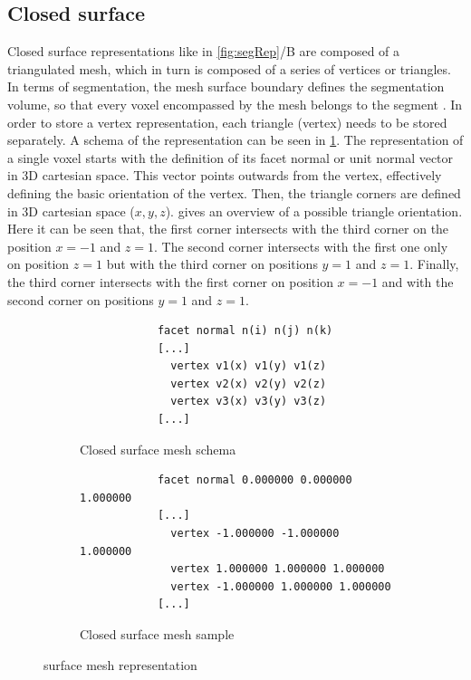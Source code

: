 \subsection{Closed surface}\label{s:b-closed-surface}
Closed surface representations like in \cref{fig:segRep}/B are composed of a triangulated mesh,
which in turn is composed of a series of vertices or triangles.
In terms of segmentation, the mesh surface boundary defines the segmentation volume,
so that every voxel encompassed by the mesh belongs to the segment \cite{delameMedialSurfaceMesh2012,weber3DSlicerPlatform2022,pinterPolymorphSegmentationRepresentation2019}.
In order to store a vertex representation, each triangle (vertex) needs to be stored separately.
A schema of the representation can be seen in \cref{fig:surfacemesh-schema}.
The representation of a single voxel starts with the definition of its facet normal or unit normal vector in 3D cartesian space.
This vector points outwards from the vertex, effectively defining the basic orientation of the vertex.
Then, the triangle corners are defined in 3D cartesian space ($x,y,z$).
 gives an overview of a possible triangle orientation.
Here it can be seen that, the first corner intersects with the third corner on the position
$x=-1$ and $z=1$.
The second corner intersects with the first one only on position $z=1$ but with the third corner on positions
$y=1$ and $z=1$.
Finally, the third corner intersects with the first corner on position $x=-1$ and
with the second corner on positions $y=1$ and $z=1$.

\begin{figure}[h] %
	\begin{subfigure}{0.49\textwidth}
		\begin{verbatim}
			facet normal n(i) n(j) n(k)
			[...]
			  vertex v1(x) v1(y) v1(z)
			  vertex v2(x) v2(y) v2(z)
			  vertex v3(x) v3(y) v3(z)
			[...]
		\end{verbatim}
		\caption{Closed surface mesh schema}\label{fig:surfacemesh-schema}
	\end{subfigure}
	\begin{subfigure}{0.49\textwidth}
		\begin{verbatim}
			facet normal 0.000000 0.000000 1.000000
			[...]
			  vertex -1.000000 -1.000000 1.000000
			  vertex 1.000000 1.000000 1.000000
			  vertex -1.000000 1.000000 1.000000
			[...]
		\end{verbatim}
		\caption{Closed surface mesh sample}\label{fig:surfacemesh}
	\end{subfigure}
	\caption{surface mesh representation}\label{fig:mesh-repesentation}
\end{figure}

